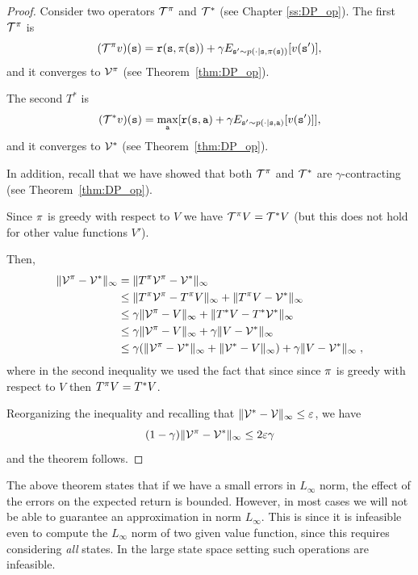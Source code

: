 \begin{proof}
Consider two operators $\mathcal{T}^\pi$ and $\mathcal{T}^*$ (see
Chapter \ref{ss:DP_op}). The first $\mathcal{T}^\pi$ is
\[
(\mathcal{T}^\pi v)({\tt s})={\tt r}({\tt s},\pi({\tt s}))+\gamma
E_{{\tt s}'\sim p(\cdot|{\tt s},\pi({\tt s}))}[v({\tt s}')],
\]
and it converges to $\mathcal{V}^\pi$ (see Theorem~\ref{thm:DP_op}).


The second $T^*$ is
\[
(\mathcal{T}^* v)({\tt s})=\max_{\tt a}[{\tt r}({\tt s},{\tt a})+\gamma
E_{{\tt s}'\sim p(\cdot|{\tt s},{\tt a})}[v({\tt s}')] ],
\]
and it converges to $\mathcal{V}^*$ (see Theorem~\ref{thm:DP_op}).

In addition, recall that we have showed that both
$\mathcal{T}^\pi$ and $\mathcal{T}^*$ are $\gamma$-contracting (see
Theorem~\ref{thm:DP_op}).

Since $\pi$ is greedy with respect to $V$ we have
$\mathcal{T}^\pi V=\mathcal{T}^* V$ (but this does not hold for
other value functions $V'$).

Then,
\begin{align*}
\|\mathcal{V}^\pi-\mathcal{V}^*\|_\infty &= \|T^\pi \mathcal{V}^\pi - \mathcal{V}^*\|_\infty\\
&\leq \|T^\pi \mathcal{V}^\pi -T^\pi V\|_\infty +\|T^\pi V - \mathcal{V}^*\|_\infty\\
&\leq \gamma\| \mathcal{V}^\pi - V\|_\infty +\|T^* V - T^*\mathcal{V}^*\|_\infty\\
&\leq \gamma\| \mathcal{V}^\pi - V\|_\infty +\gamma\| V - \mathcal{V}^*\|_\infty\\
&\leq \gamma(\| \mathcal{V}^\pi - \mathcal{V}^*\|_\infty+ \|\mathcal{V}^*-V\|_\infty ) +\gamma\| V - \mathcal{V}^*\|_\infty\;,
\end{align*}
where in the second inequality we used the fact that since since
$\pi$ is greedy with respect to $V$ then $T^\pi V=T^* V$.

Reorganizing the inequality and recalling that
$\|\mathcal{V}^*-\mathcal{V}\|_\infty\leq \varepsilon$, we have
\[
(1-\gamma)\|\mathcal{V}^\pi-\mathcal{V}^*\|_\infty \leq 2\varepsilon\gamma
\]
and the theorem follows.
\end{proof}

The above theorem states that if we have a small errors in
$L_\infty$ norm, the effect of the errors on the expected return is
bounded. However, in most cases we will not be able to guarantee an
approximation in norm $L_\infty$. This is since it is infeasible even
to compute the $L_\infty$ norm of two given value function, since
this requires considering {\em all} states. In the large state space
setting such operations are infeasible.

